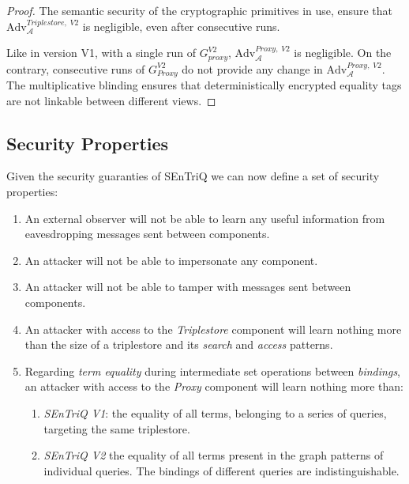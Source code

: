 \begin{proof}
    The semantic security of the cryptographic primitives in use, ensure that \linebreak $\mathrm{Adv}_{\mathcal{A}}^{Triplestore, \; V2}$ is negligible, even after consecutive runs. 
    
    Like in version V1, with a single run of $G^{V2}_{proxy}$, $\mathrm{Adv}_{\mathcal{A}}^{Proxy, \; V2}$ is negligible. On the contrary, consecutive runs of $G^{V2}_{Proxy}$ do not provide any change in $\mathrm{Adv}_{\mathcal{A}}^{Proxy, \; V2}$. The multiplicative blinding ensures that deterministically encrypted equality tags are not linkable between different views.
\end{proof}


\subsection{Security Properties}

Given the security guaranties of \gls{SEnTriQ} we can now define a set of security properties:

\begin{enumerate}
    \item An external observer will not be able to learn any useful information from eavesdropping messages sent between components.
    \item An attacker will not be able to impersonate any component.
    \item An attacker will not be able to tamper with messages sent between components.
    \item An attacker with access to the \emph{Triplestore} component will learn nothing more than the size of a triplestore and its \emph{search} and \emph{access} patterns.
    \item Regarding \emph{term equality} during intermediate set operations between \emph{bindings}, an attacker with access to the \emph{Proxy} component will learn nothing more than:
        \begin{enumerate}
            \item \emph{\gls{SEnTriQ} V1}: the equality of all terms, belonging to a series of queries, targeting the same triplestore.
            \item \emph{\gls{SEnTriQ} V2} the equality of all terms present in the graph patterns of individual queries. The bindings of different queries are indistinguishable.
        \end{enumerate}
\end{enumerate}

